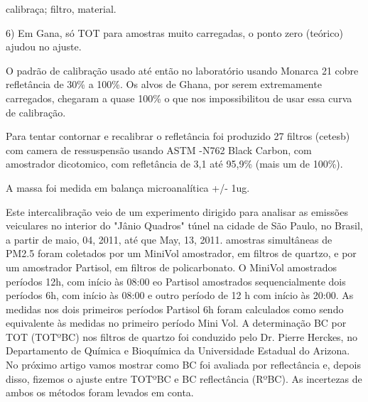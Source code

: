 calibraça; filtro, material.

6) Em Gana, só TOT para amostras muito carregadas, o ponto zero (teórico)
ajudou no ajuste.

O padrão de calibração usado até então no laboratório usando Monarca 21 cobre refletância de 30\% a 100\%. 
Os alvos de Ghana, por serem extremamente carregados, chegaram a quase 100\% o que nos impossibilitou de usar 
essa curva de calibração.  

Para tentar contornar e recalibrar o refletância foi produzido 27 filtros (cetesb) com camera de ressuspensão
usando ASTM -N762 Black Carbon, com amostrador dicotomico, com refletância de 3,1 até 95,9\% (mais um de 100\%).

A massa foi medida em balança microanalítica +/- 1ug.




Este intercalibração veio de um experimento dirigido para analisar as emissões veiculares no interior do "Jânio Quadros" túnel na cidade de São Paulo, no Brasil, a partir de maio, 04, 2011, até que May, 13, 2011. amostras simultâneas de PM2.5 foram coletados por um MiniVol amostrador, em filtros de quartzo, e por um amostrador Partisol, em filtros de policarbonato. O MiniVol amostrados períodos 12h, com início às 08:00 eo Partisol amostrados sequencialmente dois períodos 6h, com início às 08:00 e outro período de 12 h com início às 20:00. As medidas nos dois primeiros períodos Partisol 6h foram calculados como sendo equivalente às medidas no primeiro período Mini Vol.
A determinação BC por TOT (TOTºBC) nos filtros de quartzo foi conduzido pelo Dr. Pierre Herckes, no Departamento de Química e Bioquímica da Universidade Estadual do Arizona. No próximo artigo vamos mostrar como BC foi avaliada por reflectância e, depois disso, fizemos o ajuste entre TOTºBC e BC reflectância (RºBC). As incertezas de ambos os métodos foram levados em conta.



